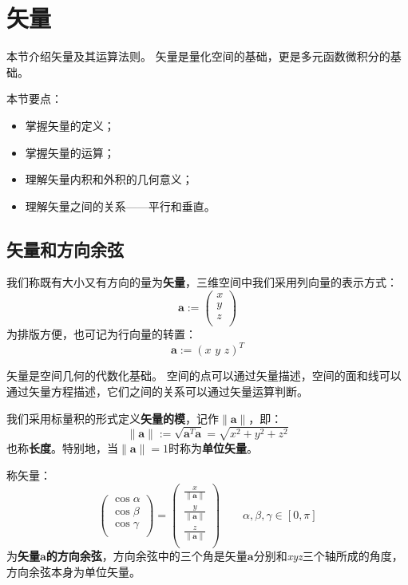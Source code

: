 \section{矢量}

本节介绍矢量及其运算法则。
矢量是量化空间的基础，更是多元函数微积分的基础。

本节要点：
\begin{itemize}
    \item 掌握矢量的定义；
    \item 掌握矢量的运算；
    \item 理解矢量内积和外积的几何意义；
    \item 理解矢量之间的关系——平行和垂直。
\end{itemize}

\subsection{矢量和方向余弦}

\begin{definition}[矢量]
我们称既有大小又有方向的量为{\bf 矢量}，三维空间中我们采用列向量的表示方式：
\[
\boldsymbol{a}:=\left( \begin{array}{c}
	x\\
	y\\
	z\\
\end{array} \right)
\]
为排版方便，也可记为行向量的转置：
\[
\boldsymbol{a}:=\left( x\,\,y\,\,z \right) ^T
\]
\end{definition}

矢量是空间几何的代数化基础。
空间的点可以通过矢量描述，空间的面和线可以通过矢量方程描述，它们之间的关系可以通过矢量运算判断。

\begin{definition}
我们采用标量积的形式定义{\bf 矢量的模}，记作$\left\| \boldsymbol{a} \right\| $，即：
\[
\left\| \boldsymbol{a} \right\| :=\sqrt{\boldsymbol{a}^T\boldsymbol{a}}=\sqrt{x^2+y^2+z^2}
\]
也称{\bf 长度}。特别地，当$\left\| \boldsymbol{a} \right\| =1$时称为{\bf 单位矢量}。

称矢量：
\[
\left( \begin{array}{c}
	\cos \alpha\\
	\cos \beta\\
	\cos \gamma\\
\end{array} \right) =\left( \begin{array}{c}
	\frac{x}{\left\| \boldsymbol{a} \right\|}\\
	\frac{y}{\left\| \boldsymbol{a} \right\|}\\
	\frac{z}{\left\| \boldsymbol{a} \right\|}\\
\end{array} \right) \qquad \alpha ,\beta ,\gamma \in \left[ 0,\pi \right]
\]
为{\bf 矢量$\boldsymbol{a}$的方向余弦}，方向余弦中的三个角是矢量$\boldsymbol{a}$分别和{\it xyz}三个轴所成的角度，方向余弦本身为单位矢量。
\end{definition}

